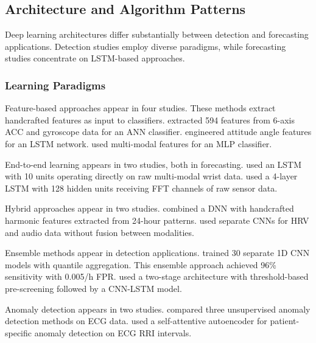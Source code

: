 \subsection{Architecture and Algorithm Patterns}

Deep learning architectures differ substantially between detection and forecasting applications. Detection studies employ diverse paradigms, while forecasting studies concentrate on LSTM-based approaches.

\subsubsection{Learning Paradigms}

Feature-based approaches appear in four studies. These methods extract handcrafted features as input to classifiers. \textcite{fineDetectionKeyAutomated2025} extracted 594 features from 6-axis ACC and gyroscope data for an ANN classifier. \textcite{wangEpilepticSeizureDetection2025} engineered attitude angle features for an LSTM network. \textcite{singhrathoreDevelopmentMultimodalMachine2024} used multi-modal features for an MLP classifier.

End-to-end learning appears in two studies, both in forecasting. \textcite{meiselMachineLearningWristband2020} used an LSTM with 10 units operating directly on raw multi-modal wrist data. \textcite{nasseriAmbulatorySeizureForecasting2021} used a 4-layer LSTM with 128 hidden units receiving FFT channels of raw sensor data.

Hybrid approaches appear in two studies. \textcite{vielufSeizureMonitoringCombined2025} combined a DNN with handcrafted harmonic features extracted from 24-hour patterns. \textcite{elemamAutomatedValidatedTool2025} used separate CNNs for HRV and audio data without fusion between modalities.

Ensemble methods appear in detection applications. \textcite{spahrDeepLearningbasedDetection2025} trained 30 separate 1D CNN models with quantile aggregation. This ensemble approach achieved 96\% sensitivity with 0.005/h FPR. \textcite{dongTwoLayerEnsembleMethod2022} used a two-stage architecture with threshold-based pre-screening followed by a CNN-LSTM model.

Anomaly detection appears in two studies. \textcite{reintjesECGBasedDetectionEpileptic2025} compared three unsupervised anomaly detection methods on ECG data. \textcite{odeDevelopmentEpilepticSeizure2023} used a self-attentive autoencoder for patient-specific anomaly detection on ECG RRI intervals.

